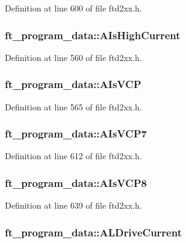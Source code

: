 Definition at line 600 of file ftd2xx.h.\hypertarget{structft__program__data_ab068b8260060f66bc10856754d581061}{
\subsubsection[{AIsHighCurrent}]{ {\bf ft\_\-program\_\-data::AIsHighCurrent}}}
\label{structft__program__data_ab068b8260060f66bc10856754d581061}


Definition at line 560 of file ftd2xx.h.\hypertarget{structft__program__data_a7b4f9d2dc2727498a52028765f8b3a15}{
\subsubsection[{AIsVCP}]{ {\bf ft\_\-program\_\-data::AIsVCP}}}
\label{structft__program__data_a7b4f9d2dc2727498a52028765f8b3a15}


Definition at line 565 of file ftd2xx.h.\hypertarget{structft__program__data_a292a1fe055651bd97f1719b6b99ced6c}{
\subsubsection[{AIsVCP7}]{ {\bf ft\_\-program\_\-data::AIsVCP7}}}
\label{structft__program__data_a292a1fe055651bd97f1719b6b99ced6c}


Definition at line 612 of file ftd2xx.h.\hypertarget{structft__program__data_a8fe4e6297f8bfe4b8dc7f9173bb35951}{
\subsubsection[{AIsVCP8}]{ {\bf ft\_\-program\_\-data::AIsVCP8}}}
\label{structft__program__data_a8fe4e6297f8bfe4b8dc7f9173bb35951}


Definition at line 639 of file ftd2xx.h.\hypertarget{structft__program__data_a10fd34a60e4eafb547a34c13ac720d40}{
\subsubsection[{ALDriveCurrent}]{ {\bf ft\_\-program\_\-data::ALDriveCurrent}}}
\label{structft__program__data_a10fd34a60e4eafb547a34c13ac720d40}


